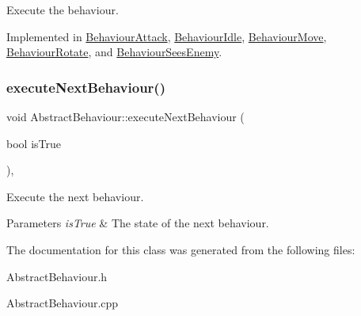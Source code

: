 Execute the behaviour. 



Implemented in \mbox{\hyperlink{class_behaviour_attack_aca669f46a6d32e5e41e7b477be1ee4cf}{Behaviour\+Attack}}, \mbox{\hyperlink{class_behaviour_idle_ac810c315b1ea41772060b216ecdc2e11}{Behaviour\+Idle}}, \mbox{\hyperlink{class_behaviour_move_a4cccd6dbe5ccf37b1522fc71a807f080}{Behaviour\+Move}}, \mbox{\hyperlink{class_behaviour_rotate_aa01153f4a487813580ecb5d5145da47c}{Behaviour\+Rotate}}, and \mbox{\hyperlink{class_behaviour_sees_enemy_afddbf2ca7396c9fd7b24f4be60edb84c}{Behaviour\+Sees\+Enemy}}.

\mbox{\label{class_abstract_behaviour_a931021cf02c0a2dd40fac4a86d1d5d25}} 
\subsubsection{\texorpdfstring{execute\+Next\+Behaviour()}{executeNextBehaviour()}}
{\footnotesize\ttfamily void Abstract\+Behaviour\+::execute\+Next\+Behaviour (\begin{DoxyParamCaption}\item[{bool}]{is\+True }\end{DoxyParamCaption})\hspace{0.3cm}{\ttfamily [protected]}, {\ttfamily [virtual]}}



Execute the next behaviour. 


\begin{DoxyParams}{Parameters}
{\em is\+True} & The state of the next behaviour.\\
\hline
\end{DoxyParams}


The documentation for this class was generated from the following files\+:\begin{DoxyCompactItemize}
\item 
Abstract\+Behaviour.\+h\item 
Abstract\+Behaviour.\+cpp\end{DoxyCompactItemize}
